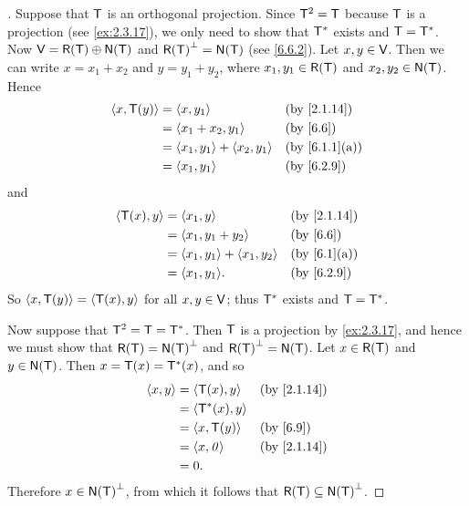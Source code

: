 \begin{proof}[]
  Suppose that \(\mathsf{T}\) is an orthogonal projection.
  Since \(\mathsf{T}^2 = \mathsf{T}\) because \(\mathsf{T}\) is a projection (see \cref{ex:2.3.17}), we only need to show that \(\mathsf{T}^*\) exists and \(\mathsf{T} = \mathsf{T}^*\).
  Now \(\V = \rg{\T} \oplus \ns{\T}\) and \(\rg{\T}^{\perp} = \ns{\T}\) (see \cref{6.6.2}).
  Let \(x, y \in \mathsf{V}\).
  Then we can write \(x = x_1 + x_2\) and \(y = y_1 + y_2\), where \(x_1, y_1 \in \rg{\T}\) and \(x_2, y_2 \in \ns{\T}\).
  Hence
  \begin{align*}
    \inn{x, \T(y)} & = \inn{x, y_1}                    &  & \by{2.1.14}   \\
                   & = \inn{x_1 + x_2, y_1}            &  & \by{6.6}      \\
                   & = \inn{x_1, y_1} + \inn{x_2, y_1} &  & \by{6.1.1}[a] \\
                   & = \inn{x_1, y_1}                  &  & \by{6.2.9}
  \end{align*}
  and
  \begin{align*}
    \inn{\T(x), y} & = \inn{x_1, y}                    &  & \by{2.1.14} \\
                   & = \inn{x_1, y_1 + y_2}            &  & \by{6.6}    \\
                   & = \inn{x_1, y_1} + \inn{x_1, y_2} &  & \by{6.1}[a] \\
                   & = \inn{x_1, y_1}.                 &  & \by{6.2.9}
  \end{align*}
  So \(\left\langle x, \mathsf{T}(y)\right\rangle = \left\langle\mathsf{T}(x), y\right\rangle\) for all \(x, y \in \mathsf{V}\);
  thus \(\mathsf{T}^*\) exists and \(\mathsf{T} = \mathsf{T}^*\).

  Now suppose that \(\mathsf{T}^2 = \mathsf{T} = \mathsf{T}^*\).
  Then \(\mathsf{T}\) is a projection by \cref{ex:2.3.17}, and hence we must show that \(\rg{\T} = \ns{\T}^{\perp}\) and \(\rg{\T}^{\perp} = \ns{\T}\).
  Let \(x \in \rg{\T}\) and \(y \in \ns{\T}\).
  Then \(x = \mathsf{T}(x) = \mathsf{T}^*(x)\), and so
  \begin{align*}
    \inn{x, y} & = \inn{\T(x), y}   &  & \by{2.1.14} \\
               & = \inn{\T^*(x), y}                  \\
               & = \inn{x, \T(y)}   &  & \by{6.9}    \\
               & = \inn{x, \zv}     &  & \by{2.1.14} \\
               & = 0.
  \end{align*}
  Therefore \(x \in \ns{\T}^{\perp}\), from which it follows that \(\rg{\T} \subseteq \ns{\T}^{\perp}\).


\end{proof}
